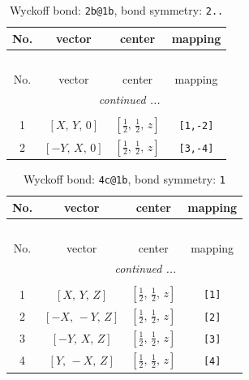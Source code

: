 \documentclass[fleqn,8pt]{jsarticle}
\begin{document}
\begin{longtable}{cccc}
\caption{Wyckoff bond: {\tt 2b@1b}, bond symmetry: {\tt 2..}}
 \\
 \hline \hline
No. & vector & center & mapping \\ \hline \endfirsthead

\multicolumn{3}{l}{\tablename\ \thetable{}} \\
 \hline \hline
No. & vector & center & mapping \\ \hline \endhead

 \hline \hline
\multicolumn{3}{r}{\footnotesize\it continued ...} \\ \endfoot

 \hline \hline
\multicolumn{3}{r}{} \\ \endlastfoot

1 & $\left[ X,\, Y,\, 0 \right]$ & $\left[ \frac{1}{2},\, \frac{1}{2},\, z \right]$ & {\tt [1,-2]} \\ \hline
2 & $\left[ - Y,\, X,\, 0 \right]$ & $\left[ \frac{1}{2},\, \frac{1}{2},\, z \right]$ & {\tt [3,-4]} \\
\end{longtable}
\renewcommand{\arraystretch}{1.2}
\begin{longtable}{cccc}
\caption{Wyckoff bond: {\tt 4c@1b}, bond symmetry: {\tt 1}}
 \\
 \hline \hline
No. & vector & center & mapping \\ \hline \endfirsthead

\multicolumn{3}{l}{\tablename\ \thetable{}} \\
 \hline \hline
No. & vector & center & mapping \\ \hline \endhead

 \hline \hline
\multicolumn{3}{r}{\footnotesize\it continued ...} \\ \endfoot

 \hline \hline
\multicolumn{3}{r}{} \\ \endlastfoot

1 & $\left[ X,\, Y,\, Z \right]$ & $\left[ \frac{1}{2},\, \frac{1}{2},\, z \right]$ & {\tt [1]} \\ \hline
2 & $\left[ - X,\, - Y,\, Z \right]$ & $\left[ \frac{1}{2},\, \frac{1}{2},\, z \right]$ & {\tt [2]} \\ \hline
3 & $\left[ - Y,\, X,\, Z \right]$ & $\left[ \frac{1}{2},\, \frac{1}{2},\, z \right]$ & {\tt [3]} \\ \hline
4 & $\left[ Y,\, - X,\, Z \right]$ & $\left[ \frac{1}{2},\, \frac{1}{2},\, z \right]$ & {\tt [4]} \\
\end{longtable}
\end{document}
